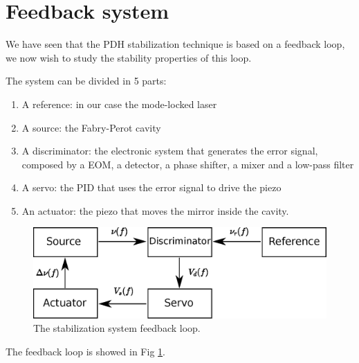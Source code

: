 \section{Feedback system}

We have seen that the PDH stabilization technique is based on a feedback loop, we now wish to study the stability properties of this loop.

The system can be divided in 5 parts:
\begin{enumerate}
	\item A reference: in our case the mode-locked laser
	\item A source: the Fabry-Perot cavity
	\item A discriminator: the electronic system that generates the error signal, composed by a EOM, a detector, a phase shifter, a mixer and a low-pass filter
	\item A servo: the PID that uses the error signal to drive the piezo
	\item An actuator: the piezo that moves the mirror inside the cavity.
\end{enumerate}
\begin{figure}
	\centering
	\includegraphics[width=0.9\linewidth]{images/loop.eps}
	\caption{The stabilization system feedback loop.}
	\label{fig:loop}
\end{figure}

The feedback loop is showed in Fig \ref{fig:loop}.

